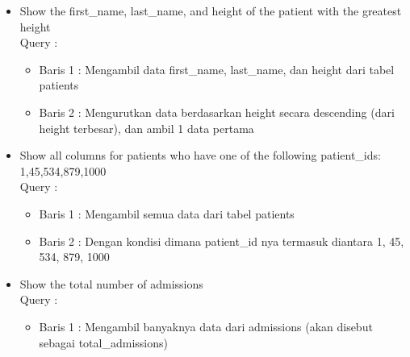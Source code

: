 \documentclass[]{article}
\begin{document}
\begin{itemize}
        \item Show the first\_name, last\_name, and height of the patient with the greatest height
        \\Query :
        
        \begin{itemize}
            \item Baris 1 : Mengambil data first\_name, last\_name, dan height dari tabel patients
            \item Baris 2 : Mengurutkan data berdasarkan height secara descending (dari height terbesar), dan ambil 1 data pertama
        \end{itemize}

        \item Show all columns for patients who have one of the following patient\_ids: 1,45,534,879,1000
        \\Query :
        
        \begin{itemize}
            \item Baris 1 : Mengambil semua data dari tabel patients
            \item Baris 2 : Dengan kondisi dimana patient\_id nya termasuk diantara 1, 45, 534, 879, 1000
        \end{itemize}

        \item Show the total number of admissions
        \\Query :
        
        \begin{itemize}
            \item Baris 1 : Mengambil banyaknya data dari admissions (akan disebut sebagai total\_admissions)
        \end{itemize}

    \end{itemize}
\end{document}
